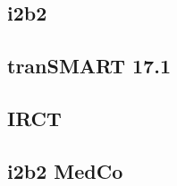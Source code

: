 




\subsection{i2b2}

\subsection{tranSMART 17.1}

\subsection{IRCT}

\subsection{i2b2 MedCo}




